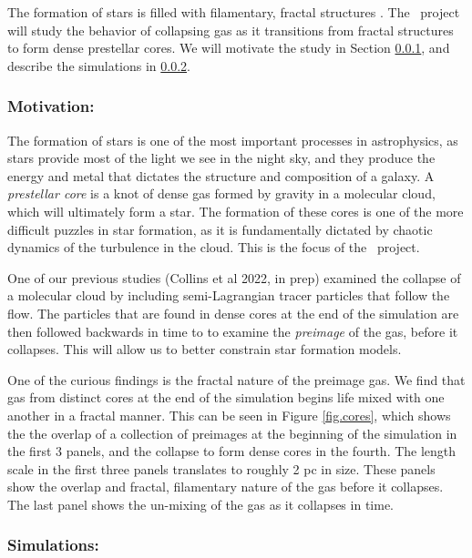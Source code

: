
The formation of stars is filled with filamentary, fractal structures
\citep{Andre14}.  The
\nameCores\ project will study the behavior of collapsing gas as it transitions
from fractal structures to form dense prestellar cores.  We will motivate the
study in Section \ref{subsec.cores_motivate}, and describe the simulations
in \ref{subsec.cores_sims}.


\subsubsection{Motivation: \nameCores}
\label{subsec.cores_motivate}
The formation of stars is one of the most important processes in astrophysics,
as stars provide most of the light we see in the night sky, and they produce the
energy and metal
that dictates the structure and composition of a galaxy.  
A \emph{prestellar core} is a knot of dense gas
formed by gravity in a molecular cloud, which will ultimately form a star.  The
formation of these cores is one of the more difficult puzzles in star formation,
as it is fundamentally dictated by chaotic dynamics of the turbulence in the
cloud.  This is the focus of the \nameCores\ project.

One of our previous studies (Collins et al 2022, in prep) examined the collapse of a molecular cloud by
including semi-Lagrangian tracer particles that follow the flow.  The particles
that are found in dense cores at the end of the simulation are then followed
backwards in time to 
to examine the \emph{preimage} of the gas, before it collapses.  This will allow
us to better constrain star formation models.  

One of the curious findings is the fractal nature of the preimage gas.  We find
that gas from distinct cores at the end of the simulation begins life mixed with
one another in a fractal manner. This can be seen in Figure
\ref{fig.cores}, which shows the the overlap of a collection of preimages at the
beginning of the simulation in the first 3 panels, and the
collapse to form dense cores in the fourth.  The length scale in the first three panels translates to
roughly 2 pc in size.  These panels show the overlap and fractal, filamentary nature of
the gas before it collapses.  The
last panel shows the un-mixing of the gas as it collapses in time.

\subsubsection{Simulations: \nameCores}
\label{subsec.cores_sims}

